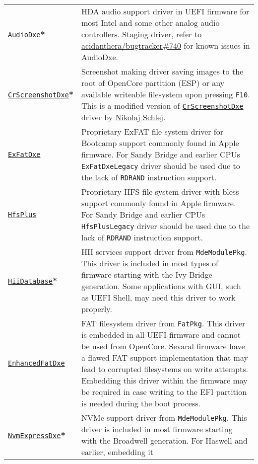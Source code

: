 \documentclass[]{article}
\begin{document}
\begin{tabular}{p{1.3in}p{5.55in}}
\href{https://github.com/acidanthera/OpenCorePkg}{\texttt{AudioDxe}}\textbf{*}
& HDA audio support driver in UEFI firmware for most Intel and some other analog audio controllers.
  Staging driver, refer to \href{https://github.com/acidanthera/bugtracker/issues/740}{acidanthera/bugtracker\#740}
  for known issues in AudioDxe. \\
\href{https://github.com/acidanthera/OpenCorePkg}{\texttt{CrScreenshotDxe}}\textbf{*}
& Screenshot making driver saving images to the root of OpenCore partition (ESP) or
  any available writeable filesystem upon pressing \texttt{F10}.
  This is a modified version of \href{https://github.com/LongSoft/CrScreenshotDxe}{\texttt{CrScreenshotDxe}}
  driver by \href{https://github.com/NikolajSchlej}{Nikolaj Schlej}. \\
\href{https://github.com/acidanthera/OcBinaryData}{\texttt{ExFatDxe}}
& Proprietary ExFAT file system driver for Bootcamp support commonly found in Apple
  firmware. For Sandy Bridge and earlier CPUs \texttt{ExFatDxeLegacy} driver should be
  used due to the lack of \texttt{RDRAND} instruction support. \\
\href{https://github.com/acidanthera/OcBinaryData}{\texttt{HfsPlus}}
& Proprietary HFS file system driver with bless support commonly found in Apple
  firmware. For Sandy Bridge and earlier CPUs \texttt{HfsPlusLegacy} driver should be
  used due to the lack of \texttt{RDRAND} instruction support. \\
\href{https://github.com/acidanthera/audk}{\texttt{HiiDatabase}}\textbf{*}
& HII services support driver from \texttt{MdeModulePkg}. This driver is included in
  most types of firmware starting with the Ivy Bridge generation. Some applications with GUI,
  such as UEFI Shell, may need this driver to work properly. \\
\href{https://github.com/acidanthera/audk}{\texttt{EnhancedFatDxe}}
& FAT filesystem driver from \texttt{FatPkg}. This driver is embedded in all
  UEFI firmware and cannot be used from OpenCore. Sevaral firmware
  have a flawed FAT support implementation that may lead to corrupted filesystems
  on write attempts. Embedding this driver within the firmware may be required in case
  writing to the EFI partition is needed during the boot process. \\
  \href{https://github.com/acidanthera/audk}{\texttt{NvmExpressDxe}}\textbf{*}
& NVMe support driver from \texttt{MdeModulePkg}. This driver is included in most
  firmware starting with the Broadwell generation. For Haswell and earlier, embedding it

\end{tabular}
\end{document}
